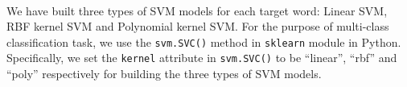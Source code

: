 \\We have built three types of SVM models for each target word: Linear SVM, RBF kernel SVM and Polynomial kernel SVM. For the purpose of multi-class classification task, we use the \texttt{svm.SVC()} method in \texttt{sklearn} module in Python. Specifically, we set the \texttt{kernel} attribute in \texttt{svm.SVC()} to be ``linear'', ``rbf'' and ``poly'' respectively for building the three types of SVM models.

